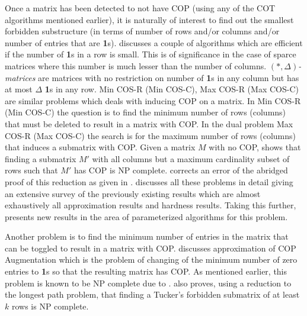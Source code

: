 \documentclass[MS,synopsis]{iitmdiss}
\def \un {\bf 1}
\begin{document}
Once a matrix has been detected to not have COP (using any of the COT
algorithms mentioned earlier), it is naturally of interest to find out
the smallest forbidden substructure (in terms of number of rows and/or
columns and/or number of entries that are {\un}s). \cite{d08phd}
discusses a couple of algorithms which are efficient if the number of
{\un}s in a row is small. This is of significance in the case of sparce
matrices where this number is much lesser than the number of
columns. $(*,\Delta)${\em -matrices} are matrices with no restriction
on number of {\un}s in any column but has at most $\Delta$ {\un}s in
any row. {\sc Min COS-R (Min COS-C), Max COS-R (Max COS-C)} are
similar problems which deals with inducing COP on a matrix. In {\sc
  Min COS-R (Min COS-C)} the question is to find the minimum number of
rows (columns) that must be deleted to result in a matrix with COP.
In the dual problem {\sc Max COS-R (Max COS-C)} the search is for the
maximum number of rows (columns) that induces a submatrix with
COP. Given a matrix $M$ with no COP, \cite{b75-phd} shows that finding
a submatrix $M'$ with all columns but a maximum cardinality
subset of rows such that $M'$ has COP is NP complete. \cite{hg02}
corrects an error of the abridged proof of this reduction as given in
\cite{gj79}.  \cite{d08phd} discusses all these problems in detail
giving an extensive survey of the previously existing results which
are almost exhaustively all approximation results and hardness
results. Taking this further, \cite{d08phd} presents new results in
the area of parameterized algorithms for this
problem.

Another problem is to find the minimum number of entries in the matrix
that can be toggled to result in a matrix with COP.  \cite{v85}
discusses approximation of {\sc COP Augmentation} which is the problem
of changing of the minimum number of zero entries to {\un}s so that the
resulting matrix has COP. As mentioned earlier, this problem is
known to be NP complete due to \cite{b75-phd}. \cite{v85} also proves,
using a reduction to the longest path problem,  that finding a Tucker's forbidden
submatrix of at least $k$ rows is NP complete.   
\end{document}
